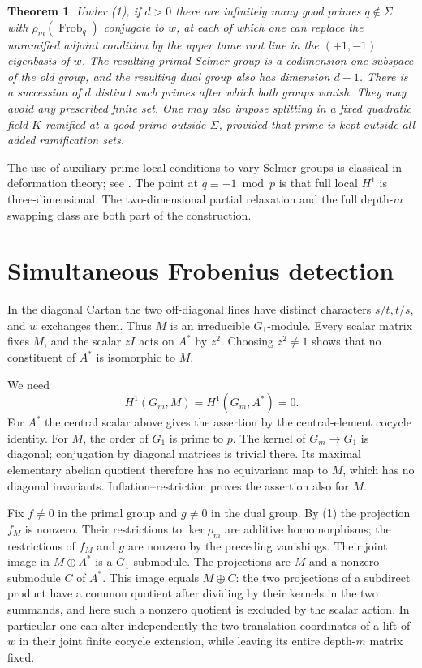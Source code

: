 \documentclass[11pt]{article}
\newtheorem{theorem}{Theorem}
\begin{document}
\begin{theorem}\label{cut}
Under (1), if $d>0$ there are infinitely many good primes
$q\notin\Sigma$ with $\rho_m(\operatorname{Frob}_q)$ conjugate to
$w$, at each of which one can replace the unramified adjoint
condition by the upper tame root line in the $(+1,-1)$ eigenbasis
of $w$. The resulting primal Selmer group is a codimension-one
subspace of the old group, and the resulting dual group also has
dimension $d-1$. There is a succession of $d$ distinct such
primes after which both groups vanish. They may avoid any
prescribed finite set. One may also impose splitting in a fixed
quadratic field $K$ ramified at a good prime outside $\Sigma$,
provided that prime is kept outside all added ramification sets.
\end{theorem}

The use of auxiliary-prime local conditions to vary Selmer groups
is classical in deformation theory; see \cite{CM,FKP}. The point at
$q\equiv-1\bmod p$ is that full local $H^1$ is three-dimensional.
The two-dimensional partial relaxation and the full depth-$m$
swapping class are both part of the construction.

\section{Simultaneous Frobenius detection}
In the diagonal Cartan the two off-diagonal lines have distinct
characters $s/t,t/s$, and $w$ exchanges them. Thus $M$ is an
irreducible $G_1$-module. Every scalar matrix fixes $M$, and the
scalar $zI$ acts on $A^*$ by $z^2$. Choosing $z^2\ne1$ shows
that no constituent of $A^*$ is isomorphic to $M$.

We need
\[
                 H^1(G_m,M)=H^1(G_m,A^*)=0.
\]
For $A^*$ the central scalar above gives the assertion by the
central-element cocycle identity. For $M$, the order of $G_1$ is
prime to $p$. The kernel of $G_m\to G_1$ is diagonal; conjugation
by diagonal matrices is trivial there. Its maximal elementary
abelian quotient therefore has no equivariant map to $M$, which has
no diagonal invariants. Inflation--restriction proves the assertion
also for $M$.

Fix $f\ne0$ in the primal group and $g\ne0$ in the dual group. By
(1) the projection $f_M$ is nonzero. Their restrictions to
$\ker\rho_m$ are additive homomorphisms; the restrictions of $f_M$
and $g$ are nonzero by the preceding vanishings. Their joint image
in $M\oplus A^*$ is a $G_1$-submodule. The projections are $M$ and
a nonzero submodule $C$ of $A^*$. This image equals $M\oplus C$:
the two projections of a subdirect product have a common quotient
after dividing by their kernels in the two summands, and here such
a nonzero quotient is excluded by the scalar action. In particular
one can alter independently the two translation coordinates of a
lift of $w$ in their joint finite cocycle extension, while leaving
its entire depth-$m$ matrix fixed.
\end{document}
